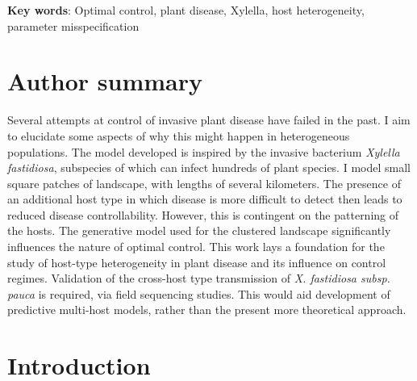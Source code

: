 \documentclass[11pt,letterpaper]{article}
\begin{document}
\textbf{Key words}: Optimal control, plant disease, Xylella, host heterogeneity, parameter misspecification

\section*{Author summary}
Several attempts at control of invasive plant disease have failed in the past. I aim to elucidate some aspects of why this might happen in heterogeneous populations. The model developed is inspired by the invasive bacterium \emph{Xylella fastidiosa}, subspecies of which can infect hundreds of plant species. I model small square patches of landscape, with lengths of several kilometers. The presence of an additional host type in which disease is more difficult to detect then leads to reduced disease controllability. However, this is contingent on the patterning of the hosts. The generative model used for the clustered landscape significantly influences the nature of optimal control. This work lays a foundation for the study of host-type heterogeneity in plant disease and its influence on control regimes. Validation of the cross-host type transmission of \emph{X. fastidiosa subsp. pauca} is required, via field sequencing studies. This would aid development of predictive multi-host models, rather than the present more theoretical approach.

\section*{Introduction}
\end{document}
